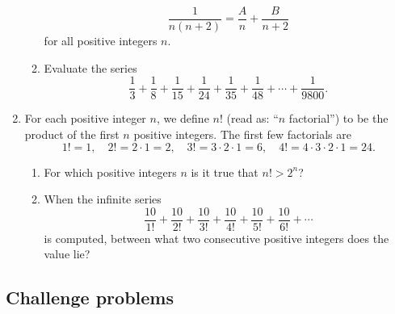 \begin{enumerate}
\begin{enumerate}
\begin{equation*}
\frac{1}{n(n + 2)} = \frac{A}{n} + \frac{B}{n + 2}
\end{equation*}
for all positive integers $n$.
\item Evaluate the series
\begin{equation*}
\frac{1}{3} + \frac{1}{8} + \frac{1}{15} + \frac{1}{24} + \frac{1}{35} + \frac{1}{48} + \cdots + \frac{1}{9800}.
\end{equation*}
\end{enumerate}
\item For each positive integer $n$, we define $n!$ (read as: ``$n$ factorial'') to be the product of the first $n$ positive integers. The first few factorials are
\begin{equation*}
1! = 1,\quad 2! = 2\cdot 1 = 2,\quad 3! = 3\cdot 2\cdot 1 = 6,\quad 4! = 4\cdot 3\cdot 2\cdot 1 = 24.
\end{equation*}
\begin{enumerate}
\item For which positive integers $n$ is it true that $n! > 2^n$?
\item When the infinite series
\begin{equation*}
\frac{10}{1!} + \frac{10}{2!} + \frac{10}{3!} + \frac{10}{4!} + \frac{10}{5!} + \frac{10}{6!} + \cdots
\end{equation*}
is computed, between what two consecutive positive integers does the value lie?
\end{enumerate}
\end{enumerate}


\subsection{Challenge problems}

